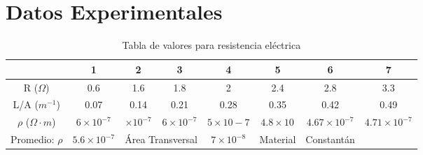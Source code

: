 \documentclass[10pt]{article}
\begin{document}
\section{Datos Experimentales}

\begin{table}[H]
	\centering
	\caption{Tabla de valores para resistencia eléctrica}
	\label{tabla-resistencia 1ra Medicion}
	\begin{tabular}{cccccccc}
		\toprule
		                          & 1                    & 2                                    & 3                  & 4               & 5                  & 6                     & 7                     \\
		\midrule
		R ($\Omega$)              & 0.6                  & 1.6                                  & 1.8                & 2               & 2.4                & 2.8                   & 3.3                   \\
		L/A ($m^{-1}$)            & 0.07                 & 0.14                                 & 0.21               & 0.28            & 0.35               & 0.42                  & 0.49                  \\
		$\rho$ ($\Omega \cdot m$) & $6 \times 10^{-7}$   & $ \times 10^{-7}$                    & $6 \times 10^{-7}$ & $5 \times 10-7$ & $4.8 \times 10^{}$ & $4.67 \times 10^{-7}$ & $4.71 \times 10^{-7}$ \\
		Promedio: $\rho$          & $5.6 \times 10^{-7}$ & \multicolumn{2}{c}{Área Transversal} & $7 \times 10^{-8}$ & Material        & Constantán                                                         \\
		\bottomrule
	\end{tabular}
\end{table}
\end{document}
